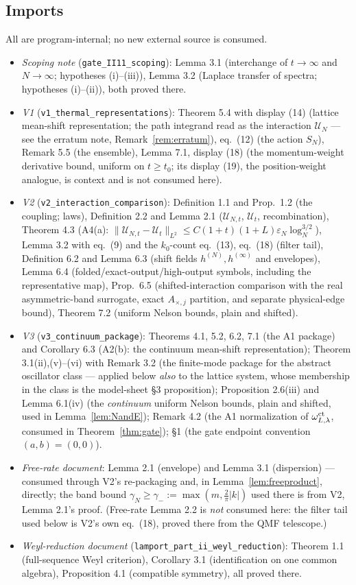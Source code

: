 \documentclass[11pt,a4paper]{article}
\theoremstyle{plain}
\theoremstyle{definition}
\newcommand{\eps}{\varepsilon}
\newcommand{\U}{\mathcal U}
\newcommand{\logN}{\log_N}
\begin{document}
\subsection{Imports}\label{sec:imports}

All are program-internal; no new external source is consumed.
\begin{itemize}
\item \emph{Scoping note} (\texttt{gate\_II11\_scoping}): Lemma 3.1
(interchange of $t\to\infty$ and $N\to\infty$; hypotheses (i)--(iii)),
Lemma 3.2 (Laplace transfer of spectra; hypotheses (i)--(ii)), both
proved there.
\item \emph{V1} (\texttt{v1\_thermal\_representations}): Theorem 5.4 with
display (14) (lattice mean-shift representation; the path integrand read
as the interaction $\U_N$ --- see the erratum note,
Remark~\ref{rem:erratum}), eq.\ (12) (the action $S_N$), Remark 5.5 (the
ensemble), Lemma 7.1, display (18) (the momentum-weight derivative bound,
uniform on $t\ge t_0$; its display (19), the position-weight analogue, is
context and is not consumed here).
\item \emph{V2} (\texttt{v2\_interaction\_comparison}): Definition 1.1 and
Prop.\ 1.2 (the coupling; laws), Definition 2.2 and Lemma 2.1
($\U_{N,t}$, $\U_t$, recombination), Theorem 4.3 (A4(a):
$\|\U_{N,t}-\U_t\|_{L^2}\le C(1+t)(1+L)\eps_N\logN^{3/2}$), Lemma 3.2
with eq.\ (9) and the $k_0$-count eq.\ (13), eq.\ (18) (filter tail),
Definition 6.2 and Lemma 6.3 (shift fields $h^{(N)},h^{(\infty)}$ and
envelopes), Lemma 6.4 (folded/exact-output/high-output symbols, including
the representative map), Prop.\ 6.5 (shifted-interaction comparison with the
real asymmetric-band surrogate, exact $A_{\times,j}$ partition, and separate
physical-edge bound), Theorem 7.2
(uniform Nelson bounds, plain and shifted).
\item \emph{V3} (\texttt{v3\_continuum\_package}): Theorems 4.1, 5.2, 6.2,
7.1 (the A1 package) and Corollary 6.3 (A2(b): the continuum mean-shift
representation); Theorem 3.1(ii),(v)--(vi) with Remark 3.2 (the finite-mode
package for the abstract oscillator class --- applied below \emph{also} to
the lattice system, whose membership in the class is the model-sheet \S3
proposition); Proposition 2.6(iii) and Lemma 6.1(iv) (the \emph{continuum}
uniform Nelson bounds, plain and shifted, used in Lemma~\ref{lem:NandE});
Remark 4.2 (the A1 normalization of $\omega^{\rm ct}_{L,\lambda}$, consumed
in Theorem~\ref{thm:gate}); \S1 (the gate endpoint convention
$(a,b)=(0,0)$).
\item \emph{Free-rate document}: Lemma 2.1 (envelope) and Lemma 3.1
(dispersion) --- consumed through V2's re-packaging and, in
Lemma~\ref{lem:freeproduct}, directly; the band bound
$\gamma_N\ge\gamma_-:=\max(m,\tfrac2\pi|k|)$ used there is from V2,
Lemma 2.1's proof. (Free-rate Lemma 2.2 is \emph{not} consumed here: the
filter tail used below is V2's own eq.\ (18), proved there from the QMF
telescope.)
\item \emph{Weyl-reduction document}
(\texttt{lamport\_part\_ii\_weyl\_reduction}): Theorem 1.1 (full-sequence
Weyl criterion), Corollary 3.1 (identification on one common algebra),
Proposition 4.1 (compatible symmetry), all proved there.
\end{itemize}
\end{document}
